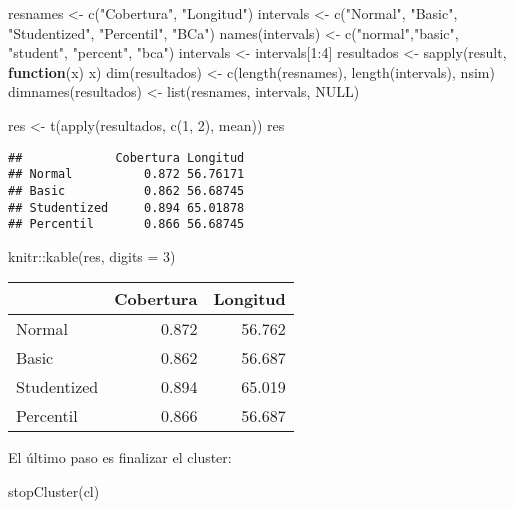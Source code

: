 \documentclass[
]{book}
\newenvironment{Shaded}{\begin{snugshade}}{\end{snugshade}}
\newcommand{\AttributeTok}[1]{\textcolor[rgb]{0.77,0.63,0.00}{#1}}
\newcommand{\ConstantTok}[1]{\textcolor[rgb]{0.00,0.00,0.00}{#1}}
\newcommand{\ControlFlowTok}[1]{\textcolor[rgb]{0.13,0.29,0.53}{\textbf{#1}}}
\newcommand{\DecValTok}[1]{\textcolor[rgb]{0.00,0.00,0.81}{#1}}
\newcommand{\FunctionTok}[1]{\textcolor[rgb]{0.00,0.00,0.00}{#1}}
\newcommand{\NormalTok}[1]{#1}
\newcommand{\OtherTok}[1]{\textcolor[rgb]{0.56,0.35,0.01}{#1}}
\newcommand{\SpecialCharTok}[1]{\textcolor[rgb]{0.00,0.00,0.00}{#1}}
\newcommand{\StringTok}[1]{\textcolor[rgb]{0.31,0.60,0.02}{#1}}
\theoremstyle{break}
\theoremstyle{definition}
\theoremstyle{definition}
\theoremstyle{definition}
\theoremstyle{definition}
\theoremstyle{remark}
\begin{document}
\begin{Shaded}
\begin{Highlighting}[]
\NormalTok{resnames }\OtherTok{\textless{}{-}} \FunctionTok{c}\NormalTok{(}\StringTok{"Cobertura"}\NormalTok{, }\StringTok{"Longitud"}\NormalTok{)}
\NormalTok{intervals }\OtherTok{\textless{}{-}} \FunctionTok{c}\NormalTok{(}\StringTok{"Normal"}\NormalTok{, }\StringTok{"Basic"}\NormalTok{, }\StringTok{"Studentized"}\NormalTok{, }\StringTok{"Percentil"}\NormalTok{, }\StringTok{"BCa"}\NormalTok{)}
\FunctionTok{names}\NormalTok{(intervals) }\OtherTok{\textless{}{-}} \FunctionTok{c}\NormalTok{(}\StringTok{"normal"}\NormalTok{,}\StringTok{"basic"}\NormalTok{, }\StringTok{"student"}\NormalTok{, }\StringTok{"percent"}\NormalTok{, }\StringTok{"bca"}\NormalTok{)}
\NormalTok{intervals }\OtherTok{\textless{}{-}}\NormalTok{ intervals[}\DecValTok{1}\SpecialCharTok{:}\DecValTok{4}\NormalTok{]}
\NormalTok{resultados }\OtherTok{\textless{}{-}} \FunctionTok{sapply}\NormalTok{(result, }\ControlFlowTok{function}\NormalTok{(x) x)}
\FunctionTok{dim}\NormalTok{(resultados) }\OtherTok{\textless{}{-}} \FunctionTok{c}\NormalTok{(}\FunctionTok{length}\NormalTok{(resnames), }\FunctionTok{length}\NormalTok{(intervals), nsim)}
\FunctionTok{dimnames}\NormalTok{(resultados) }\OtherTok{\textless{}{-}} \FunctionTok{list}\NormalTok{(resnames, intervals, }\ConstantTok{NULL}\NormalTok{)}

\NormalTok{res }\OtherTok{\textless{}{-}} \FunctionTok{t}\NormalTok{(}\FunctionTok{apply}\NormalTok{(resultados, }\FunctionTok{c}\NormalTok{(}\DecValTok{1}\NormalTok{, }\DecValTok{2}\NormalTok{), mean))}
\NormalTok{res}
\end{Highlighting}
\end{Shaded}

\begin{verbatim}
##             Cobertura Longitud
## Normal          0.872 56.76171
## Basic           0.862 56.68745
## Studentized     0.894 65.01878
## Percentil       0.866 56.68745
\end{verbatim}

\begin{Shaded}
\begin{Highlighting}[]
\NormalTok{knitr}\SpecialCharTok{::}\FunctionTok{kable}\NormalTok{(res, }\AttributeTok{digits =} \DecValTok{3}\NormalTok{)}
\end{Highlighting}
\end{Shaded}

\begin{tabular}{l|r|r}
\hline
  & Cobertura & Longitud\\
\hline
Normal & 0.872 & 56.762\\
\hline
Basic & 0.862 & 56.687\\
\hline
Studentized & 0.894 & 65.019\\
\hline
Percentil & 0.866 & 56.687\\
\hline
\end{tabular}

El último paso es finalizar el cluster:

\begin{Shaded}
\begin{Highlighting}[]
\FunctionTok{stopCluster}\NormalTok{(cl)}
\end{Highlighting}
\end{Shaded}


  
\end{document}
